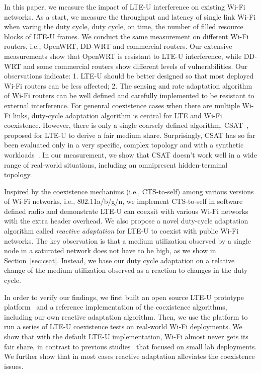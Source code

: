 In this paper, we measure the impact of LTE-U interference on existing Wi-Fi networks.
As a start, we measure the throughput and latency of single link Wi-Fi when varing
the duty cycle, duty cycle, on time, the number of filled resource blocks 
of LTE-U frames. 
We conduct the same measurement on different Wi-Fi routers, 
i.e., OpenWRT, DD-WRT and commercial routers. 
Our extensive measurements show that OpenWRT is resistant to LTE-U
interference, while DD-WRT and some commercial routers
show different levels of vulnerabilities. 
Our observations indicate: 1. LTE-U should be better designed
so that most deployed Wi-Fi routers can be less affected; 
2. The sensing and rate adaptation algorithm of Wi-Fi routers
can be well defined and carefully implemented to 
be resistant to external interference. 
For genenral coexistence cases when there are multiple Wi-Fi links, 
duty-cycle adaptation algorithm is central for LTE and Wi-Fi coexistence.
However, there is only a single coarsely defined algorithm, 
CSAT~\cite{lteuforum_csat}, proposed for LTE-U to derive a fair medium share.
Surprisingly, CSAT has so far been evaluated only in a very specific, 
complex topology and with a synthetic workloads~\cite{qualcommpresentation}. 
In our measurement, we show that CSAT doesn't work well in a wide range of real-world situations, including an omnipresent hidden-terminal topology. 


Inspired by the coexistence mechanims (i.e., CTS-to-self) 
among various versions of Wi-Fi networks, 
i.e., 802.11a/b/g/n, 
we implement CTS-to-self in software defined radio
and demonstrate LTE-U can coexsit with various
Wi-Fi networks with the extra header overhead. 
We also propose a novel duty-cycle adaptation algorithm called {\em reactive adaptation}
for LTE-U to coexist with public Wi-Fi networks.
The key observation is that a medium utilization observed 
by a single node in a saturated network does not have to be high, 
as we show in Section~\ref{sec:csat}. 
Instead, we base our duty cycle adaptation on a relative change of 
the medium utilization observed as a reaction to changes in the duty cycle. 

In order to verify our findings, we first built an open source LTE-U prototype platform~\cite{OpenLTEU} and a reference implementation of the coexistence algorithms, including our own reactive adaptation algorithm. 
Then, we use the platform to run a series of LTE-U coexistence tests on real-world Wi-Fi deployments. 
We show that with the default LTE-U implementation, Wi-Fi almost never gets its fair share, in contrast to previous studies~\cite{qualcommpresentation} that focused on small lab deployments. 
We further show that in most cases reactive adaptation alleviates the coexistence issues. 

